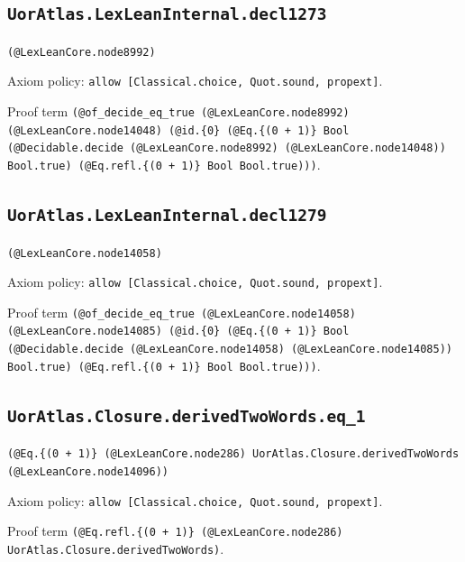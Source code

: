 \documentclass[11pt]{article}
\begin{document}
\subsection*{\texttt{UorAtlas.LexLeanInternal.decl1273}}
\noindent\texttt{(@LexLeanCore.node8992)}\par
\noindent Axiom policy: \texttt{allow [Classical.choice, Quot.sound, propext]}.\par
\noindent Proof term \texttt{(@of\_decide\_eq\_true (@LexLeanCore.node8992) (@LexLeanCore.node14048) (@id.\{0\} (@Eq.\{(0 + 1)\} Bool (@Decidable.decide (@LexLeanCore.node8992) (@LexLeanCore.node14048)) Bool.true) (@Eq.refl.\{(0 + 1)\} Bool Bool.true)))}.\par
\subsection*{\texttt{UorAtlas.LexLeanInternal.decl1279}}
\noindent\texttt{(@LexLeanCore.node14058)}\par
\noindent Axiom policy: \texttt{allow [Classical.choice, Quot.sound, propext]}.\par
\noindent Proof term \texttt{(@of\_decide\_eq\_true (@LexLeanCore.node14058) (@LexLeanCore.node14085) (@id.\{0\} (@Eq.\{(0 + 1)\} Bool (@Decidable.decide (@LexLeanCore.node14058) (@LexLeanCore.node14085)) Bool.true) (@Eq.refl.\{(0 + 1)\} Bool Bool.true)))}.\par
\subsection*{\texttt{UorAtlas.Closure.derivedTwoWords.eq\_1}}
\noindent\texttt{(@Eq.\{(0 + 1)\} (@LexLeanCore.node286) UorAtlas.Closure.derivedTwoWords (@LexLeanCore.node14096))}\par
\noindent Axiom policy: \texttt{allow [Classical.choice, Quot.sound, propext]}.\par
\noindent Proof term \texttt{(@Eq.refl.\{(0 + 1)\} (@LexLeanCore.node286) UorAtlas.Closure.derivedTwoWords)}.\par
\end{document}
